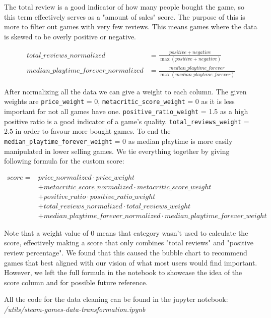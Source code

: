 \documentclass{article}
\begin{document}
	The total review is a good indicator of how many people bought the game, so this term effectively serves as a "amount of sales"  score. The purpose of this is more to filter out games with very few reviews. This means games where the data is skewed to be overly positive or negative.
	
	\begin{align}
		total\_reviews\_normalized &= \frac{positive + negative}{\max{\left(positive + negative\right)}}\\
		median\_playtime\_forever\_normalized &= \frac{median\_playtime\_forever}{\max{\left(median\_playtime\_forever\right)}}	
	\end{align}
		
	After normalizing all the data we can give a weight to each column. The given weights are \texttt{price\_weight} = 0, \texttt{metacritic\_score\_weight} = 0 as it is less important for not all games have one. \texttt{positive\_ratio\_weight} = 1.5 as a high positive ratio is a good indicator of a game's quality. \texttt{total\_reviews\_weight} = 2.5 in order to favour more bought games. To end the \texttt{median\_playtime\_forever\_weight} = 0 as median playtime is more easily manipulated in lower selling games. 
    We tie everything together by giving following formula for the custom score:
	
	\begin{align}
		score = &price\_normalized\cdot price\_weight\\
		 &+ metacritic\_score\_normalized\cdot metacritic\_score\_weight\\
		 &+ positive\_ratio\cdot positive\_ratio\_weight\\
		 &+ total\_reviews\_normalized\cdot total\_reviews\_weight\\
		 &+ median\_playtime\_forever\_normalized\cdot median\_playtime\_forever\_weight
	\end{align}
	
    Note that a weight value of 0 means that category wasn't used to calculate the score, effectively making a score that only combines "total reviews" and "positive review percentage". We found that this caused the bubble chart to recommend games that best aligned with our vision of what most users would find important. However, we left the full formula in the notebook to showcase the idea of the score column and for possible future reference.
    
	All the code for the data cleaning can be found in the jupyter notebook: \textit{/utils/steam-games-data-transformation.ipynb}
	
\end{document}
